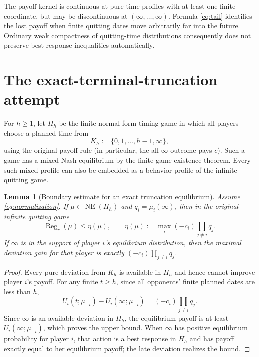 \documentclass[11pt,a4paper]{article}
\numberwithin{equation}{section}
\theoremstyle{plain}
\newtheorem{lemma}[theorem]{Lemma}
\theoremstyle{definition}
\theoremstyle{remark}
\newcommand{\Reg}{\operatorname{Reg}}
\newcommand{\NE}{\operatorname{NE}}
\begin{document}
The payoff kernel is continuous at pure time profiles with at least one
finite coordinate, but may be discontinuous at
$(\infty,\ldots,\infty)$. Formula \eqref{eq:tail} identifies the lost
payoff when finite quitting dates move arbitrarily far into the future.
Ordinary weak compactness of quitting-time distributions consequently
does not preserve best-response inequalities automatically.

\section{The exact-terminal-truncation attempt}\label{sec:trunc}
For $h\ge1$, let $H_h$ be the finite normal-form timing game in which
all players choose a planned time from
\begin{equation}\label{eq:Kh}
 K_h:=\{0,1,\ldots,h-1,\infty\},
\end{equation}
using the original payoff rule (in particular, the all-$\infty$ outcome
pays $c$). Such a game has a mixed Nash equilibrium by the finite-game
existence theorem. Every such mixed profile can also be embedded as a
behavior profile of the infinite quitting game.

\begin{lemma}[Boundary estimate for an exact truncation equilibrium]\label{lem:boundary}
Assume \eqref{eq:normalization}. If $\mu\in\NE(H_h)$ and
$q_i=\mu_i(\infty)$, then in the original infinite quitting game
\begin{equation}\label{eq:eta}
 \Reg_r(\mu)\le\eta(\mu),\qquad
 \eta(\mu):=\max_i(-c_i)\prod_{j\ne i}q_j.
\end{equation}
If $\infty$ is in the support of player $i$'s equilibrium distribution,
then the maximal deviation gain \emph{for that player} is exactly
$(-c_i)\prod_{j\ne i}q_j$.
\end{lemma}
\begin{proof}
Every pure deviation from $K_h$ is available in $H_h$ and hence
cannot improve player $i$'s payoff. For any finite $t\ge h$, since
all opponents' finite planned dates are less than $h$,
\begin{equation}\label{eq:tailfinite}
 U_i(t;\mu_{-i})-U_i(\infty;\mu_{-i})
 =(-c_i)\prod_{j\ne i}q_j.
\end{equation}
Since $\infty$ is an available deviation in $H_h$, the equilibrium
payoff is at least $U_i(\infty;\mu_{-i})$, which proves the upper
bound. When $\infty$ has positive equilibrium probability for player $i$,
that action is a best response in $H_h$ and has payoff exactly equal
to her equilibrium payoff; the late deviation realizes the bound.
\end{proof}
\end{document}
